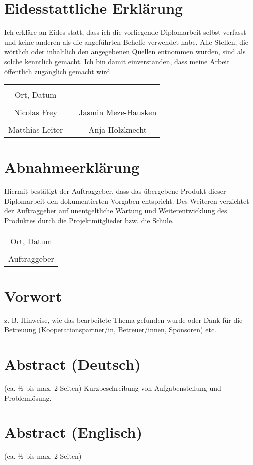 \chapter*{Eidesstattliche Erklärung}
Ich erkläre an Eides statt, dass ich die vorliegende Diplomarbeit selbst
verfasst und keine anderen als die angeführten Behelfe verwendet habe. Alle Stellen, die wörtlich oder inhaltlich den angegebenen Quellen entnommen wurden, sind als solche kenntlich gemacht.
Ich bin damit einverstanden, dass meine Arbeit öffentlich zugänglich gemacht wird.

\vspace{1cm}
\begin{tabular}{c c c}
	                & \hspace{4cm} &                \\\cline{1-1}
	Ort, Datum      &              &                \\
	\vspace{2cm}
	                &              &                \\\cline{1-1}\cline{3-3}
	Nicolas Frey &              & Jasmin Meze-Hausken \\ 
	\vspace{2cm}
	                &              &                \\\cline{1-1}\cline{3-3}
	Matthias Leiter      &              & Anja Holzknecht  \\ 
\end{tabular}

\chapter*{Abnahmeerklärung}
Hiermit bestätigt der Auftraggeber, dass das übergebene Produkt dieser Diplomarbeit den dokumentierten Vorgaben entspricht. Des Weiteren verzichtet der Auftraggeber auf unentgeltliche Wartung und Weiterentwicklung des Produktes durch die Projektmitglieder bzw. die Schule.

\vspace{1cm}
\begin{tabular}{c}
	\\\cline{1-1}
	Ort, Datum \\
	\vspace{2cm}
	\\\cline{1-1}
	Auftraggeber
\end{tabular}

\chapter*{Vorwort}
z. B. Hinweise, wie das bearbeitete Thema gefunden wurde oder Dank für die Betreuung (Kooperationspartner/in, Betreuer/innen, Sponsoren) etc.


\chapter*{Abstract (Deutsch)}
 (ca. ½ bis max. 2 Seiten)
Kurzbeschreibung von Aufgabenstellung und Problemlösung.

\chapter*{Abstract (Englisch)}
 (ca. ½ bis max. 2 Seiten)